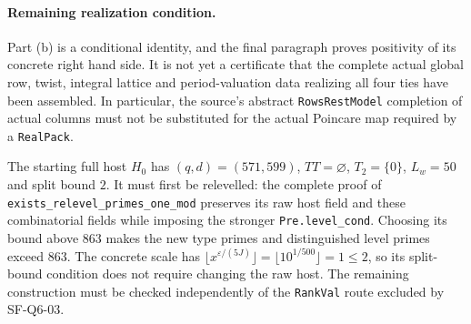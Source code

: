 \paragraph{Remaining realization condition.}
Part (b) is a conditional identity, and the final paragraph proves
positivity of its concrete right hand side.  It is not yet a
certificate that the complete actual global row, twist, integral
lattice and period-valuation data realizing all four ties have
been assembled.  In particular, the source's abstract
\texttt{RowsRestModel} completion of actual columns must not be
substituted for the actual Poincare map required by a
\texttt{RealPack}.

The starting full host $H_0$ has $(q,d)=(571,599)$,
$TT=\varnothing$, $T_2=\{0\}$, $L_w=50$ and split bound $2$.
It must first be relevelled: the complete proof of
\texttt{exists\_relevel\_primes\_one\_mod} preserves its raw host
field and these combinatorial fields while imposing the stronger
\texttt{Pre.level\_cond}.  Choosing its bound above $863$ makes
the new type primes and distinguished level primes exceed $863$.
The concrete scale has
$\lfloor x^{\varepsilon/(5J)}\rfloor
 =\lfloor10^{1/500}\rfloor=1\le2$,
so its split-bound condition does not require changing the raw host.
The remaining construction must be checked independently of the
\texttt{RankVal} route excluded by SF-Q6-03.

